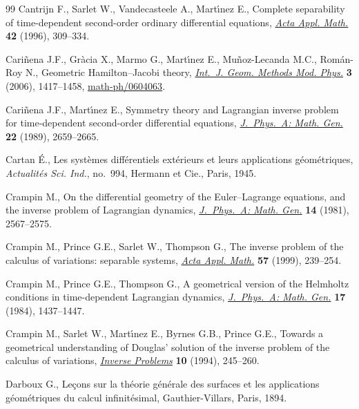 \documentclass[pdftex]{sigma}
\begin{document}
\begin{thebibliography}{99}
Cantrijn F., Sarlet W., Vandecasteele A., Mart{\'{\i}}nez E., Complete
  separability of time-dependent second-order ordinary dif\/ferential equations,
  \href{http://dx.doi.org/10.1007/BF01064171}{\textit{Acta Appl. Math.}} \textbf{42} (1996), 309--334.

Cari{\~n}ena J.F., Gr{\`a}cia X., Marmo G., Mart{\'{\i}}nez E.,
  Mu{\~n}oz-Lecanda M.C., Rom{\'a}n-Roy N., Geometric {H}amilton--{J}acobi
  theory, \href{http://dx.doi.org/10.1142/S0219887806001764}{\textit{Int.~J. Geom. Methods Mod. Phys.}} \textbf{3} (2006),
  1417--1458, \href{http://arxiv.org/abs/math-ph/0604063}{math-ph/0604063}.

Cari{\~n}ena J.F., Mart{\'{\i}}nez E., Symmetry theory and {L}agrangian inverse
  problem for time-dependent second-order dif\/ferential equations,
  \href{http://dx.doi.org/10.1088/0305-4470/22/14/016}{\textit{J.~Phys.~A: Math. Gen.}} \textbf{22} (1989), 2659--2665.

Cartan {\'E}., Les syst\`emes dif\/f\'erentiels ext\'erieurs et leurs
  applications g\'eom\'etriques, {\it Actualit\'es Sci. Ind.}, no.~994, Hermann et
  Cie., Paris, 1945.

Crampin M., On the dif\/ferential geometry of the {E}uler--{L}agrange equations,
  and the inverse problem of {L}agrangian dynamics, \href{http://dx.doi.org/10.1088/0305-4470/14/10/012}{\textit{J.~Phys.~A: Math.
  Gen.}} \textbf{14} (1981), 2567--2575.

Crampin M., Prince G.E., Sarlet W., Thompson G., The inverse problem of the
  calculus of variations: separable systems, \href{http://dx.doi.org/10.1023/A:1006238108507}{\textit{Acta Appl. Math.}}
  \textbf{57} (1999), 239--254.

Crampin M., Prince G.E., Thompson G., A geometrical version of the {H}elmholtz
  conditions in time-dependent {L}agrangian dynamics, \href{http://dx.doi.org/10.1088/0305-4470/17/7/011}{\textit{J.~Phys.~A: Math.
  Gen.}} \textbf{17} (1984), 1437--1447.

Crampin M., Sarlet W., Mart{\'{\i}}nez E., Byrnes G.B., Prince G.E., Towards a
  geometrical understanding of {D}ouglas' solution of the inverse problem of
  the calculus of variations, \href{http://dx.doi.org/10.1088/0266-5611/10/2/005}{\textit{Inverse Problems}} \textbf{10} (1994),
  245--260.

Darboux G., Le\c{c}ons sur la th\'eorie g\'en\'erale des surfaces et les
  applications g\'eom\'etriques du calcul inf\/init\'esimal, Gauthier-Villars,
  Paris, 1894.


\end{thebibliography}
\end{document}
